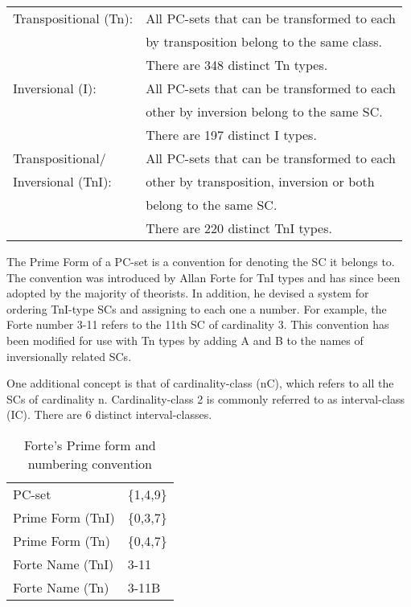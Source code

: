 \documentclass{article}
\begin{document}
\begin{center}
\begin{tabular}{ll}
 Transpositional (Tn):  &  All PC-sets that can be transformed to each  \\
                        &  by transposition belong to the same class.   \\
                        &  There are 348 distinct Tn types.             \\
 Inversional (I):       &  All PC-sets that can be transformed to each  \\
                        &  other by inversion belong to the same SC.    \\
                        &  There are 197 distinct I types.              \\
 Transpositional/       &  All PC-sets that can be transformed to each  \\
 Inversional (TnI):     &  other by transposition, inversion or both    \\
                        &  belong to the same SC.                       \\
                        &  There are 220 distinct TnI types.            \\
\end{tabular}
\end{center}



The Prime Form of a PC-set is a convention for denoting the SC it
belongs to. The convention was introduced by Allan Forte
\citep{Forte1973} for TnI types and has since been adopted by the
majority of theorists. In addition, he devised a system for ordering
TnI-type SCs and assigning to each one a number. For example, the
Forte number 3-11 refers to the 11th SC of cardinality 3. This
convention has been modified for use with Tn types by adding A and B
to the names of inversionally related SCs.

One additional concept is that of cardinality-class (nC), which refers
to all the SCs of cardinality n. Cardinality-class 2 is commonly
referred to as interval-class (IC). There are 6 distinct
interval-classes.
\begin{table}[htb]
\caption{Forte's Prime form and numbering convention} 
\begin{center}
\begin{tabular}{ll}
 PC-set            &  \{1,4,9\}  \\
 Prime Form (TnI)  &  \{0,3,7\}  \\
 Prime Form (Tn)   &  \{0,4,7\}  \\
 Forte Name (TnI)  &  3-11       \\
 Forte Name (Tn)   &  3-11B      \\
\end{tabular}
\end{center}
\end{table}
\end{document}
